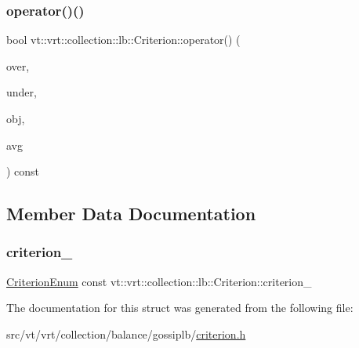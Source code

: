 \subsubsection{\texorpdfstring{operator()()}{operator()()}}
{\footnotesize\ttfamily bool vt\+::vrt\+::collection\+::lb\+::\+Criterion\+::operator() (\begin{DoxyParamCaption}\item[{\hyperlink{structvt_1_1vrt_1_1collection_1_1lb_1_1_criterion_base_a78e6b14fc6f7b34acac1d7cd4e850180}{Load\+Type}}]{over,  }\item[{\hyperlink{structvt_1_1vrt_1_1collection_1_1lb_1_1_criterion_base_a78e6b14fc6f7b34acac1d7cd4e850180}{Load\+Type}}]{under,  }\item[{\hyperlink{structvt_1_1vrt_1_1collection_1_1lb_1_1_criterion_base_a78e6b14fc6f7b34acac1d7cd4e850180}{Load\+Type}}]{obj,  }\item[{\hyperlink{structvt_1_1vrt_1_1collection_1_1lb_1_1_criterion_base_a78e6b14fc6f7b34acac1d7cd4e850180}{Load\+Type}}]{avg }\end{DoxyParamCaption}) const\hspace{0.3cm}{\ttfamily [inline]}}



\subsection{Member Data Documentation}
\mbox{\label{structvt_1_1vrt_1_1collection_1_1lb_1_1_criterion_abec00c435938c265ec0b3e3d984c09a6}} 
\subsubsection{\texorpdfstring{criterion\+\_\+}{criterion\_}}
{\footnotesize\ttfamily \hyperlink{namespacevt_1_1vrt_1_1collection_1_1lb_a4e454750e102cf5404d5ac151148951c}{Criterion\+Enum} const vt\+::vrt\+::collection\+::lb\+::\+Criterion\+::criterion\+\_\+\hspace{0.3cm}{\ttfamily [protected]}}



The documentation for this struct was generated from the following file\+:\begin{DoxyCompactItemize}
\item 
src/vt/vrt/collection/balance/gossiplb/\hyperlink{criterion_8h}{criterion.\+h}\end{DoxyCompactItemize}
